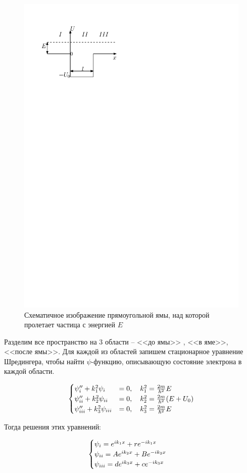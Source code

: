 \documentclass[a4paper,12pt]{article}
\newcommand{\RNumb}[1]{\uppercase\expandafter{\romannumeral #1\relax}}
\begin{document}
\begin{figure}[h]
	\centering
	\includegraphics[width=0.5\linewidth]{fig1}
	\caption{Схематичное изображение прямоугольной ямы, над которой пролетает частица с энергией $E$}
	\label{fig1:potential_well}
\end{figure}

Разделим все пространство на 3 области -- <<до ямы>> , <<в яме>>, <<после ямы>>. Для каждой из областей запишем стационарное уравнение Шредингера, чтобы найти $\psi$-функцию, описывающую состояние электрона в каждой области.

\begin{align*}
	\begin{cases}
	\psi^{\prime \prime}_{\RNumb{1}} + k_1^2 \psi_{\RNumb{1}} &= 0, \quad k_1^2 = \frac{2m}{\hbar^2}E \\
	\psi^{\prime \prime}_{\RNumb{2}} + k_2^2 \psi_{\RNumb{2}} &= 0, \quad k_2^2 = \frac{2m}{\hbar^2}(E+U_0) \\
	\psi^{\prime \prime}_{\RNumb{3}} + k_3^2 \psi_{\RNumb{3}} &= 0, \quad k_3^2 = \frac{2m}{\hbar^2}E
	\end{cases}
\end{align*}

Тогда решения этих уравнений:

\begin{align*}
	\begin{cases}
		\psi_{\RNumb{1}} = e^{ik_1x} + r e^{-ik_1x} \\
		\psi_{\RNumb{2}} = A e^{ik_2x} + B e^{-ik_2x} \\
		\psi_{\RNumb{3}} = d e^{ik_3x} + c e^{-ik_3x}
	\end{cases}
\end{align*}
\end{document}
